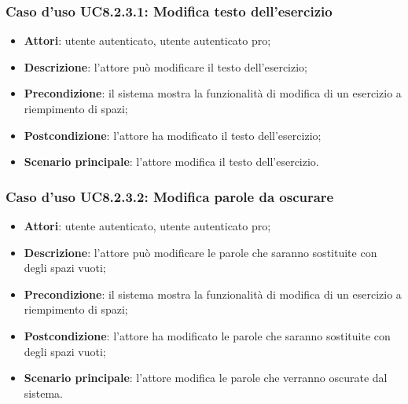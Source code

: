 \subsubsection{Caso d'uso UC8.2.3.1: Modifica testo dell'esercizio}
	\begin{itemize}
		\item
			\textbf{Attori}: utente autenticato, utente autenticato pro;
		\item		
			\textbf{Descrizione}: l'attore può modificare il testo dell'esercizio;
		\item
			\textbf{Precondizione}: il sistema mostra la funzionalità di modifica di un esercizio a riempimento di spazi;
		\item
			\textbf{Postcondizione}: l'attore ha modificato il testo dell'esercizio;
		\item
			\textbf{Scenario principale}: l'attore modifica il testo dell'esercizio.
	\end{itemize}


\subsubsection{Caso d'uso UC8.2.3.2: Modifica parole da oscurare}
	\begin{itemize}
		\item
			\textbf{Attori}: utente autenticato, utente autenticato pro;
		\item		
			\textbf{Descrizione}: l'attore può modificare le parole che saranno sostituite con degli spazi vuoti;
		\item
			\textbf{Precondizione}: il sistema mostra la funzionalità di modifica di un esercizio a riempimento di spazi;
		\item
			\textbf{Postcondizione}: l'attore ha modificato le parole che saranno sostituite con degli spazi vuoti;
		\item
			\textbf{Scenario principale}: l'attore modifica le parole che verranno oscurate dal sistema.
	\end{itemize}
